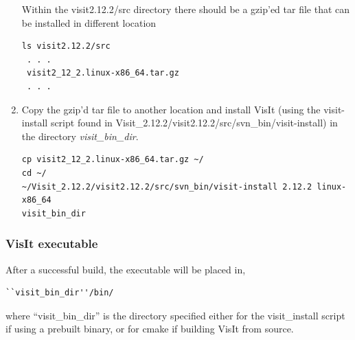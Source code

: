 \documentclass[12pt]{article}
\begin{document}
\begin{enumerate}
Within the visit2.12.2/src directory there should be a gzip'ed tar
file that can be installed in different location 

\begin{verbatim}
ls visit2.12.2/src
 . . . 
 visit2_12_2.linux-x86_64.tar.gz
 . . .
\end{verbatim}

\item Copy the gzip'd tar file to another location and install VisIt
  (using the visit-install script found in
  Visit\_2.12.2/visit2.12.2/src/svn\_bin/visit-install) in the directory
  \emph{visit\_bin\_dir}.

\begin{verbatim}
cp visit2_12_2.linux-x86_64.tar.gz ~/
cd ~/
~/Visit_2.12.2/visit2.12.2/src/svn_bin/visit-install 2.12.2 linux-x86_64
visit_bin_dir
\end{verbatim}



\end{enumerate}


\subsubsection{VisIt executable}
\label{sec:VisItExecutable}

After a successful build, the executable will be placed in,

\begin{verbatim}
``visit_bin_dir''/bin/
\end{verbatim}

where ``visit\_bin\_dir'' is the directory specified either for the
visit\_install script if using a prebuilt binary, or for cmake if
building VisIt from source.


\end{document}
